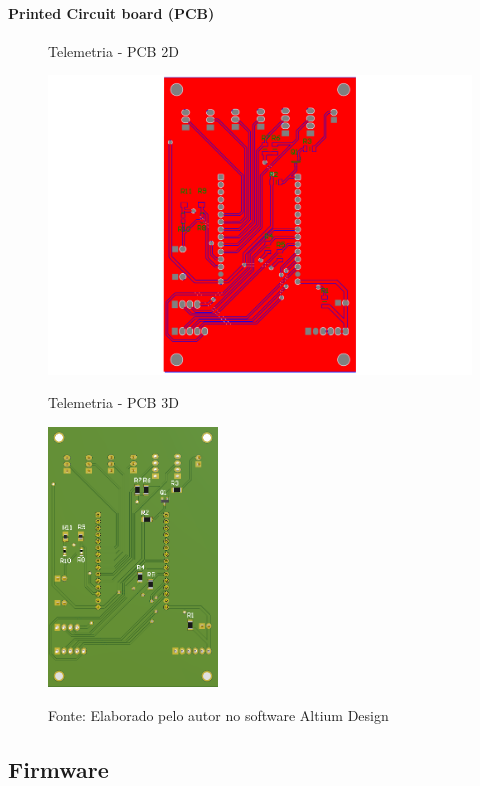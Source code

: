 \documentclass[../delivery_hospital_report.tex]{subfiles}
\begin{document}
\paragraph{Printed Circuit board (PCB)}

\begin{figure}[!ht]
    \centering
    \begin{minipage}{0.5\textwidth}
        \centering
        \caption{Telemetria - PCB 2D}
        \includegraphics[width=1.03\textwidth]{modulos/Telemetria_Oficial-5.png} 
        \label{fig:figura1minipg}
    \end{minipage}\hfill
    \begin{minipage}{0.5\textwidth}
        \centering
        \caption{Telemetria - PCB 3D}
        \includegraphics[width=0.4\textwidth]{modulos/Telemetria_Oficial.png} 
        \label{fig:figura1minipg}
    \end{minipage}\hfill
    
    \caption*{Fonte: Elaborado pelo autor no software Altium Design\cite{altium21} }
    \label{fig:figurasminipg}
\end{figure}

\subsection{Firmware}
\end{document}

